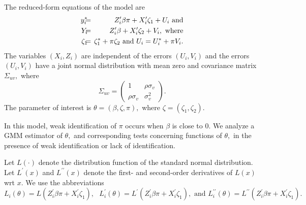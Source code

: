 \documentclass[12pt,thmsb,titlepage,final,oneside,letterpaper]{article}
\begin{document}
The reduced-form equations of the model are%
\begin{eqnarray}
y_{i}^{\ast }\hspace{-0.08in} &=&\hspace{-0.08in}Z_{i}^{\prime }\beta \pi
+X_{i}^{\prime }\zeta _{1}+U_{i}\text{ and}  \notag \\
Y_{i}\hspace{-0.08in} &=&\hspace{-0.08in}Z_{i}^{\prime }\beta +X_{i}^{\prime
}\zeta _{2}+V_{i},\text{ where}  \notag \\
\zeta _{1}\hspace{-0.08in} &=&\hspace{-0.08in}\zeta _{1}^{\ast }+\pi \zeta
_{2}\text{ and }U_{i}=U_{i}^{\ast }+\pi V_{i}.  \label{Probit-red eqns}
\end{eqnarray}%
The variables $(X_{i},Z_{i})$ are independent of the errors $(U_{i},V_{i})$
and the errors $(U_{i},V_{i})$ have a joint normal distribution with mean
zero and covariance matrix $\Sigma _{uv},$ where%
\begin{equation}
\Sigma _{uv}=\left( 
\begin{array}{cc}
1 & \rho \sigma _{v} \\ 
\rho \sigma _{v} & \sigma _{v}^{2}%
\end{array}%
\right) .
\end{equation}%
The parameter of interest is $\theta =(\beta ,\zeta ,\pi ),$ where $\zeta
=(\zeta _{1},\zeta _{2}).$

In this model, weak identification of $\pi $ occurs when $\beta $ is close
to $0.$ We analyze a GMM estimator of $\theta ,$ and corresponding tests
concerning functions of $\theta ,$ in the presence of weak identification or
lack of identification.

Let $L(\cdot )$ denote the distribution function of the standard normal
distribution. Let $L^{\prime }(x)$ and $L^{\prime \prime }(x)$ denote the
first- and second-order derivatives of $L(x)$ wrt $x.$ We use the
abbreviations 
\begin{equation}
L_{i}(\theta )=L(Z_{i}^{\prime }\beta \pi +X_{i}^{\prime }\zeta _{1}),\text{ 
}L_{i}^{\prime }(\theta )=L^{\prime }(Z_{i}^{\prime }\beta \pi
+X_{i}^{\prime }\zeta _{1}),\text{ and }L_{i}^{\prime \prime }(\theta
)=L^{\prime \prime }(Z_{i}^{\prime }\beta \pi +X_{i}^{\prime }\zeta _{1}).
\end{equation}
\end{document}
